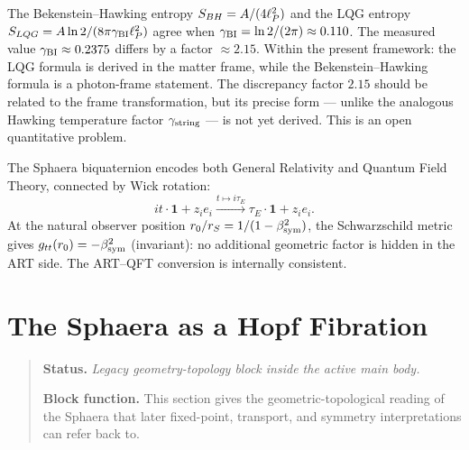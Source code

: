 \begin{remark}
The Bekenstein--Hawking entropy $S_{BH}=A/(4\ell_P^2)$ and the LQG entropy
$S_{LQG}=A\ln 2/(8\pi\gamma_{\mathrm{BI}}\ell_P^2)$ agree when $\gamma_{\mathrm{BI}}=\ln 2/(2\pi)\approx 0.110$.
The measured value $\gamma_{\mathrm{BI}}\approx 0.2375$ differs by a factor $\approx 2.15$.
Within the present framework: the LQG formula is derived in the matter
frame, while the Bekenstein--Hawking formula is a photon-frame statement.
The discrepancy factor $2.15$ should be related to the frame
transformation, but its precise form --- unlike the analogous Hawking
temperature factor $\gamma_{\mathrm{string}}$ --- is not yet derived.
This is an open quantitative problem.
\end{remark}

\begin{theorem}\label{thm:artqft}
The Sphaera biquaternion encodes both General Relativity and Quantum
Field Theory, connected by Wick rotation:
\[
  it\cdot\mathbf{1} + z_i e_i
  \xrightarrow{t\mapsto i\tau_E}
  \tau_E\cdot\mathbf{1} + z_i e_i.
\]
At the natural observer position $r_0/r_S = 1/(1-\beta_{\mathrm{sym}}^2)$, the
Schwarzschild metric gives $g_{tt}(r_0)=-\beta_{\mathrm{sym}}^2$ (invariant): no
additional geometric factor is hidden in the ART side.
The ART--QFT conversion is internally consistent.
\end{theorem}


\section{The Sphaera as a Hopf Fibration}
\begin{quote}\small
\noindent\textbf{Status.} \emph{Legacy geometry-topology block inside the active main body.}\par
\noindent\textbf{Block function.} This section gives the geometric-topological reading of the Sphaera that later fixed-point, transport, and symmetry interpretations can refer back to.
\end{quote}
\label{sec:hopf}

